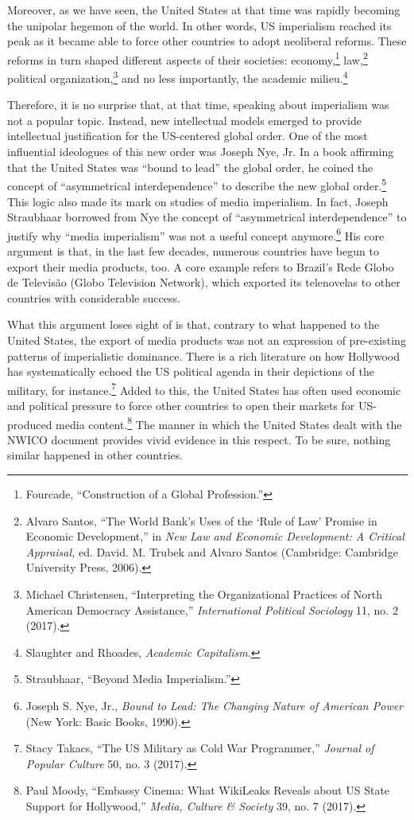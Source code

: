 \documentclass{tufte-handout}
\begin{document}
Moreover, as we have seen, the United States at that time was rapidly
becoming the unipolar hegemon of the world. In other words, US
imperialism reached its peak as it became able to force other countries
to adopt neoliberal reforms. These reforms in turn shaped different
aspects of their societies: economy,\footnote{Fourcade, ``Construction
  of a Global Profession.''} law,\footnote{Alvaro Santos, ``The World
  Bank's Uses of the `Rule of Law' Promise in Economic Development,'' in
  \emph{New Law and Economic Development: A Critical Appraisal,} ed.
  David. M. Trubek and Alvaro Santos (Cambridge: Cambridge University
  Press, 2006).} political organization,\footnote{Michael Christensen,
  ``Interpreting the Organizational Practices of North American
  Democracy Assistance,'' \emph{International Political Sociology} 11,
  no. 2 (2017).} and no less importantly, the academic
milieu.\footnote{Slaughter and Rhoades, \emph{Academic Capitalism}.}

Therefore, it is no surprise that, at that time, speaking about
imperialism was not a popular topic. Instead, new intellectual models
emerged to provide intellectual justification for the US-centered global
order. One of the most influential ideologues of this new order was
Joseph Nye, Jr. In a book affirming that the United States was ``bound
to lead'' the global order, he coined the concept of ``asymmetrical
interdependence'' to describe the new global order.\footnote{Straubhaar, ``Beyond Media
  Imperialism.''} This
logic also made its mark on studies of media imperialism. In fact,
Joseph Straubhaar borrowed from Nye the concept of ``asymmetrical
interdependence'' to justify why ``media imperialism'' was not a useful
concept anymore.\footnote{Joseph S. Nye, Jr., \emph{Bound to Lead: The
  Changing Nature of American Power} (New York: Basic Books, 1990).} His
core argument is that, in the last few decades, numerous countries have
begun to export their media products, too. A core example refers to
Brazil's Rede Globo de Televisão (Globo Television Network), which
exported its telenovelas to other countries with considerable success.

What this argument loses sight of is that, contrary to what happened to
the United States, the export of media products was not an expression of
pre-existing patterns of imperialistic dominance. There is a rich
literature on how Hollywood has systematically echoed the US political
agenda in their depictions of the military, for instance.\footnote{Stacy Takacs, ``The US Military as Cold War
  Programmer,'' \emph{Journal of Popular Culture} 50, no. 3
  (2017).}
Added to this, the United States has often used economic and political
pressure to force other countries to open their markets for US-produced
media content.\footnote{Paul Moody, ``Embassy Cinema: What WikiLeaks
  Reveals about US State Support for Hollywood,'' \emph{Media, Culture
  \& Society} 39, no. 7 (2017).} The manner in which the United States
dealt with the NWICO document provides vivid evidence in this respect.
To be sure, nothing similar happened in other countries.
\end{document}
